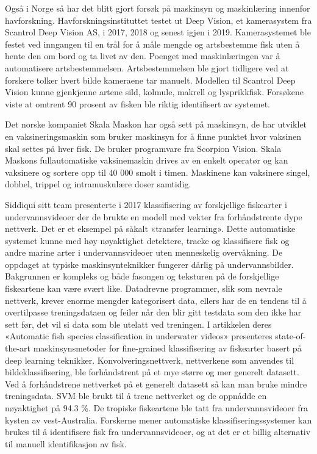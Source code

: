 
Også i Norge så har det blitt gjort forsøk på maskinsyn og maskinlæring innenfor havforskning. Havforskningsinstituttet testet ut Deep Vision, et kamerasystem fra Scantrol Deep Vision AS, i 2017, 2018 og senest igjen i 2019. Kamerasystemet ble festet ved inngangen til en trål for å måle mengde og artsbestemme fisk uten å hente den om bord og ta livet av den. Poenget med maskinlæringen var å automatisere artsbestemmelsen. Artsbestemmelsen ble gjort tidligere ved at forskere tolker hvert bilde kameraene tar manuelt. Modellen til Scantrol Deep Vision kunne gjenkjenne artene sild, kolmule, makrell og lysprikkfisk. Forsøkene viste at omtrent 90 prosent av fisken ble riktig identifisert av systemet. \cite{Fenstad 2019}

Det norske kompaniet Skala Maskon har også sett på maskinsyn, de har utviklet en vaksineringsmaskin som bruker maskinsyn for å finne punktet hvor vaksinen skal settes på hver fisk. De bruker programvare fra Scorpion Vision. Skala Maskons fullautomatiske vaksinemaskin drives av en enkelt operatør og kan vaksinere og sortere opp til 40 000 smolt i timen. Maskinene kan vaksinere singel, dobbel, trippel og intramuskulære doser samtidig. \cite{Falstad 2016}

Siddiqui sitt team presenterte i 2017 klassifisering av forskjellige fiskearter i undervannsvideoer der de brukte en modell med vekter fra forhåndstrente dype nettverk. Det er et eksempel på såkalt «transfer learning». Dette automatiske systemet kunne med høy nøyaktighet detektere, tracke og klassifisere fisk og andre marine arter i undervannsvideoer uten menneskelig overvåkning. De oppdaget at typiske maskinsynteknikker fungerer dårlig på undervannsbilder. Bakgrunnen er kompleks og både fasongen og teksturen på de forskjellige fiskeartene kan være svært like. Datadrevne programmer, slik som nevrale nettverk, krever enorme mengder kategorisert data, ellers har de en tendens til å overtilpasse treningsdataen og feiler når den blir gitt testdata som den ikke har sett før, det vil si data som ble utelatt ved treningen. I artikkelen deres  «Automatic fish species classification in underwater videos» presenteres state-of-the-art maskinsynsmetoder for fine-grained klassifisering av fiskearter basert på deep learning teknikker. Konvolveringsnettverk, nettverkene som anvendes til bildeklassifisering, ble forhåndstrent på et mye større og mer generelt datasett. Ved å forhåndstrene nettverket på et generelt datasett så kan man bruke mindre treningsdata. SVM ble brukt til å trene nettverket og de oppnådde en nøyaktighet på 94.3 \%. De tropiske fiskeartene ble tatt fra undervannsvideoer fra kysten av vest-Australia. Forskerne mener automatiske klassifiseringssystemer kan brukes til å identifisere fisk fra undervannsvideoer, og at det er et billig alternativ til manuell identifikasjon av fisk. \cite{Siddiqui m.fl. 2017}


